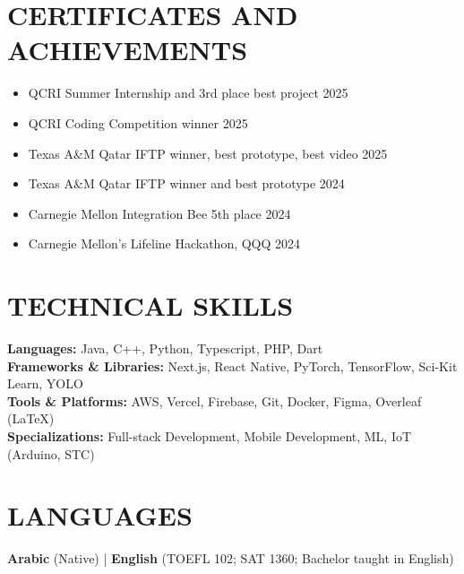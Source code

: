\documentclass[11pt,a4paper]{article}
\begin{document}
\section*{CERTIFICATES AND ACHIEVEMENTS}
\begin{itemize}[leftmargin=0em, nosep, label={}]
    \item QCRI Summer Internship and 3rd place best project \hfill 2025
    \item QCRI Coding Competition winner \hfill 2025
    \item Texas A\&M Qatar IFTP winner, best prototype, best video \hfill 2025
    \item Texas A\&M Qatar IFTP winner and best prototype \hfill 2024
    \item Carnegie Mellon Integration Bee 5th place \hfill 2024
    \item Carnegie Mellon's Lifeline Hackathon, QQQ \hfill 2024
\end{itemize}

\section*{TECHNICAL SKILLS}
\textbf{Languages:} Java, C++, Python, Typescript, PHP, Dart \\[4pt]
\textbf{Frameworks \& Libraries:} Next.js, React Native, PyTorch, TensorFlow, Sci-Kit Learn, YOLO \\[4pt]
\textbf{Tools \& Platforms:} AWS, Vercel, Firebase, Git, Docker, Figma, Overleaf (LaTeX) \\[4pt]
\textbf{Specializations:} Full-stack Development, Mobile Development, ML, IoT (Arduino, STC)

\section*{LANGUAGES}
\textbf{Arabic} (Native) \quad | \quad \textbf{English} (TOEFL 102; SAT 1360; Bachelor taught in English)
\end{document}
